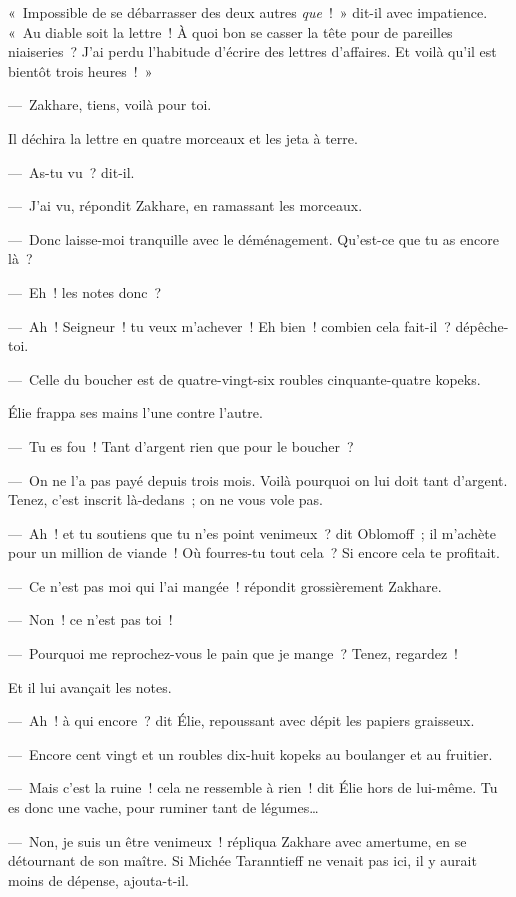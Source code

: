 \documentclass[french,twoside]{book} %
\begin{document}
« Impossible de se débarrasser des deux autres \emph{que} ! » dit-il avec impatience. « Au diable soit la lettre ! À quoi bon se casser la tête pour de pareilles niaiseries ? J’ai perdu l’habitude d’écrire des lettres d’affaires. Et voilà qu’il est bientôt trois heures ! »\par
— Zakhare, tiens, voilà pour toi.\par
Il déchira la lettre en quatre morceaux et les jeta à terre.\par
— As-tu vu ? dit-il.\par
— J’ai vu, répondit Zakhare, en ramassant les morceaux.\par
— Donc laisse-moi tranquille avec le déménagement. Qu’est-ce que tu as encore là ?\par
— Eh ! les notes donc ?\par
— Ah ! Seigneur ! tu veux m’achever ! Eh bien ! combien cela fait-il ? dépêche-toi.\par
— Celle du boucher est de quatre-vingt-six roubles cinquante-quatre kopeks.\par
Élie frappa ses mains l’une contre l’autre.\par
— Tu es fou ! Tant d’argent rien que pour le boucher ?\par
— On ne l’a pas payé depuis trois mois. Voilà pourquoi on lui doit tant d’argent. Tenez, c’est inscrit là-dedans ; on ne vous vole pas.\par
— Ah ! et tu soutiens que tu n’es point venimeux ? dit Oblomoff ; il m’achète pour un million de viande ! Où fourres-tu tout cela ? Si encore cela te profitait.\par
— Ce n’est pas moi qui l’ai mangée ! répondit grossièrement Zakhare.\par
— Non ! ce n’est pas toi !\par
— Pourquoi me reprochez-vous le pain que je mange ? Tenez, regardez !\par
Et il lui avançait les notes.\par
— Ah ! à qui encore ? dit Élie, repoussant avec dépit les papiers graisseux.\par
— Encore cent vingt et un roubles dix-huit kopeks au boulanger et au fruitier.\par
— Mais c’est la ruine ! cela ne ressemble à rien ! dit Élie hors de lui-même. Tu es donc une vache, pour ruminer tant de légumes…\par
— Non, je suis un être venimeux ! répliqua Zakhare avec amertume, en se détournant de son maître. Si Michée Taranntieff ne venait pas ici, il y aurait moins de dépense, ajouta-t-il.\par
\end{document}
